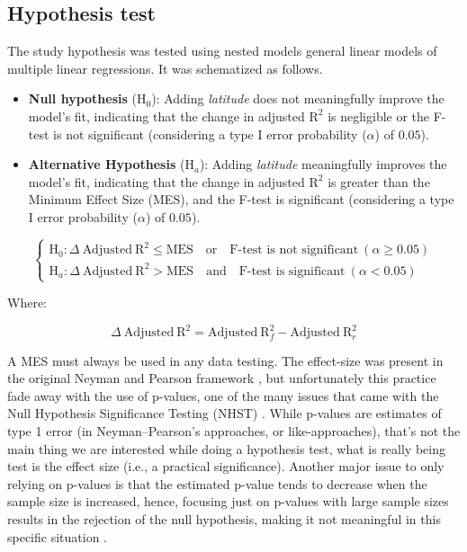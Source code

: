 \documentclass[
12pt,
openright,
oneside,
a4paper,
chapter=TITLE,
section=TITLE,
french,
spanish,
brazil,
english
]{abntex2}
\begin{document}
\subsection{Hypothesis test}\label{hypothesis-test}

The study hypothesis was tested using nested models general linear
models of multiple linear regressions. It was schematized as follows.

\begin{itemize}
\item
  \textbf{Null hypothesis} (\(\text{H}_{0}\)): Adding \emph{latitude}
  does not meaningfully improve the model's fit, indicating that the
  change in adjusted \(\text{R}^{2}\) is negligible or the F-test is not
  significant (considering a type I error probability (\(\alpha\)) of
  \(0.05\)).
\item
  \textbf{Alternative Hypothesis} (\(\text{H}_{a}\)): Adding
  \emph{latitude} meaningfully improves the model's fit, indicating that
  the change in adjusted \(\text{R}^{2}\) is greater than the Minimum
  Effect Size (MES), and the F-test is significant (considering a type I
  error probability (\(\alpha\)) of \(0.05\)).
\end{itemize}

\[
\begin{cases}
\text{H}_{0}: \Delta \ \text{Adjusted} \ \text{R}^{2} \leq \text{MES} \quad \text{or} \quad \text{F-test is not significant} \ (\alpha \geq 0.05) \\
\text{H}_{a}: \Delta \ \text{Adjusted} \ \text{R}^{2} > \text{MES} \quad \text{and} \quad \text{F-test is significant} \ (\alpha < 0.05)
\end{cases}
\]

Where:

\[
\Delta \ \text{Adjusted} \ \text{R}^{2} = \text{Adjusted} \ \text{R}^{2}_{f} - \text{Adjusted} \ \text{R}^{2}_{r}
\]

A MES must always be used in any data testing. The effect-size was
present in the original Neyman and Pearson framework
\autocite{neyman1928,neyman1928a}, but unfortunately this practice fade
away with the use of p-values, one of the many issues that came with the
Null Hypothesis Significance Testing (NHST)
\autocite{perezgonzalez2015}. While p-values are estimates of type 1
error (in Neyman--Pearson's approaches, or like-approaches), that's not
the main thing we are interested while doing a hypothesis test, what is
really being test is the effect size (i.e., a practical significance).
Another major issue to only relying on p-values is that the estimated
p-value tends to decrease when the sample size is increased, hence,
focusing just on p-values with large sample sizes results in the
rejection of the null hypothesis, making it not meaningful in this
specific situation \autocite{lin2013,mariscal2021}.
\end{document}
